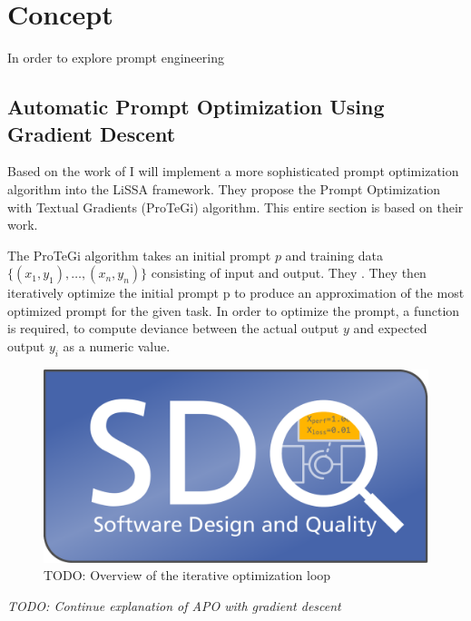 \chapter{Concept}
\label{conecpt}

In order to explore prompt engineering

\section{Automatic Prompt Optimization Using Gradient Descent}
Based on the work of  I will implement a more sophisticated prompt optimization algorithm into the LiSSA framework. They propose the Prompt Optimization with Textual Gradients (ProTeGi) algorithm. This entire section is based on their work.

The ProTeGi algorithm takes an initial prompt $p$ and training data $\{(x_1, y_1), \dots, (x_n, y_n)\}$ consisting of input and output. They . They then iteratively optimize the initial prompt p to produce an approximation of the most optimized prompt for the given task. In order to optimize the prompt, a function is required, to compute deviance between the actual output $y$ and expected output $y_i$ as a numeric value.

\begin{figure}[h]
\centering
\includegraphics[width=12cm]{logos/sdqlogo}
\caption{TODO: Overview of the iterative optimization loop}
\label{fig:sdqlogo}
\end{figure}

\textit{TODO: Continue explanation of APO with gradient descent}

